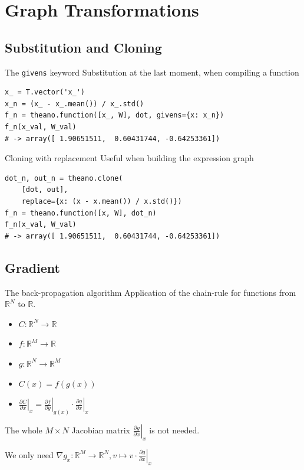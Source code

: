\documentclass[a4paper,9pt]{beamer}
\begin{document}
\section{Graph Transformations}
\begin{frame}
  \tableofcontents[currentsection]
\end{frame}

\subsection{Substitution and Cloning}
\begin{frame}[fragile]{The {\tt givens} keyword}
  Substitution at the last moment, when compiling a function
  \begin{verbatim}
x_ = T.vector('x_')
x_n = (x_ - x_.mean()) / x_.std()
f_n = theano.function([x_, W], dot, givens={x: x_n})
f_n(x_val, W_val)
# -> array([ 1.90651511,  0.60431744, -0.64253361])
  \end{verbatim}
\end{frame}

\begin{frame}[fragile]{Cloning with replacement}
  Useful when building the expression graph
  \begin{verbatim}
dot_n, out_n = theano.clone(
    [dot, out],
    replace={x: (x - x.mean()) / x.std()})
f_n = theano.function([x, W], dot_n)
f_n(x_val, W_val)
# -> array([ 1.90651511,  0.60431744, -0.64253361])
  \end{verbatim}
\end{frame}

\subsection{Gradient}
\begin{frame}{The back-propagation algorithm}
  Application of the chain-rule for functions from ${\mathbb R}^N$ to ${\mathbb R}$.
  \begin{itemize}
    \item $C: {\mathbb R}^N \rightarrow {\mathbb R}$
    \item $f: {\mathbb R}^M \rightarrow {\mathbb R}$
    \item $g: {\mathbb R}^N \rightarrow {\mathbb R}^M$
    \item $C(x) = f(g(x))$
    \item $\left.\frac{\partial C}{\partial x}\right|_x =
              \left.\frac{\partial f}{\partial g}\right|_{g(x)}
              \cdot \left.\frac{\partial g}{\partial x}\right|_x$
  \end{itemize}
  The whole $M \times N$ Jacobian matrix $\left.\frac{\partial g}{\partial x}\right|_x$
  is not needed.

  We only need $\nabla g_x: {\mathbb R}^M \rightarrow {\mathbb R}^N, v \mapsto v \cdot \left.\frac{\partial g}{\partial x}\right|_x$
\end{frame}
\end{document}
